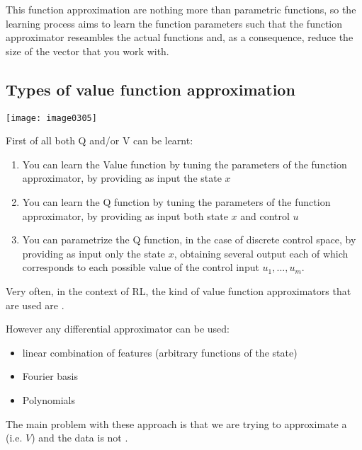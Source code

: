 This function approximation are nothing more than parametric functions, so the learning process aims to learn the function parameters such that the function approximator reseambles the actual functions and, as a consequence, reduce the size of the vector that you work with.


\subsection{Types of value function approximation}

\begin{minipage}{0.3\textwidth}
\centering
\texttt{[image: image0305]}
\end{minipage}
\hfill
\begin{minipage}{.7\textwidth}
First of all both Q and/or V can be learnt:
\begin{enumerate}
\item You can learn the Value function by tuning the parameters of the function approximator, by providing as input the state $x$
\item You can learn the Q function by tuning the parameters of the function approximator, by providing as input both state $x$ and control $u$
\item You can parametrize the Q function, in the case of discrete control space, by providing as input only the state $x$, obtaining several output each of which corresponds to each possible value of the control input $u_1, ..., u_m$.
\end{enumerate} 

\end{minipage}

Very often, in the context of RL, the kind of value function approximators that are used are .

However any differential approximator can be used:
\begin{itemize}
\item linear combination of features (arbitrary functions of the state)
\item Fourier basis
\item Polynomials
\end{itemize}

The main problem with these approach is that we are trying to approximate a  (i.e. $V$) and the data is not .

